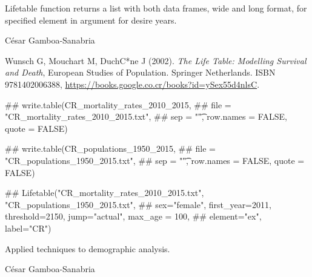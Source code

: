 \documentclass[a4paper]{book}
\begin{document}
%
\begin{Value}
Lifetable function returns a list with both data frames, wide and long format, for specified element in argument  for desire years.
\end{Value}
%
\begin{Author}\relax
César Gamboa-Sanabria
\end{Author}
%
\begin{References}\relax
Wunsch G, Mouchart M, DuchC*ne J (2002).
\emph{The Life Table: Modelling Survival and Death},  European Studies of Population.
Springer Netherlands.
ISBN 9781402006388, \url{https://books.google.co.cr/books?id=ySex55d4nlsC}.
\end{References}
%
\begin{Examples}
\begin{ExampleCode}

## write.table(CR_mortality_rates_2010_2015,
## file = "CR_mortality_rates_2010_2015.txt",
## sep = "\t", row.names = FALSE, quote = FALSE)

## write.table(CR_populations_1950_2015,
## file = "CR_populations_1950_2015.txt",
## sep = "\t", row.names = FALSE, quote = FALSE)

## Lifetable("CR_mortality_rates_2010_2015.txt", "CR_populations_1950_2015.txt",
## sex="female", first_year=2011, threshold=2150, jump="actual", max_age = 100,
## element="ex", label="CR")


\end{ExampleCode}
\end{Examples}
%
\begin{Description}\relax
Applied techniques to demographic analysis.
\end{Description}
%
\begin{Author}\relax
César Gamboa-Sanabria 
\end{Author}
\printindex{}
\end{document}
